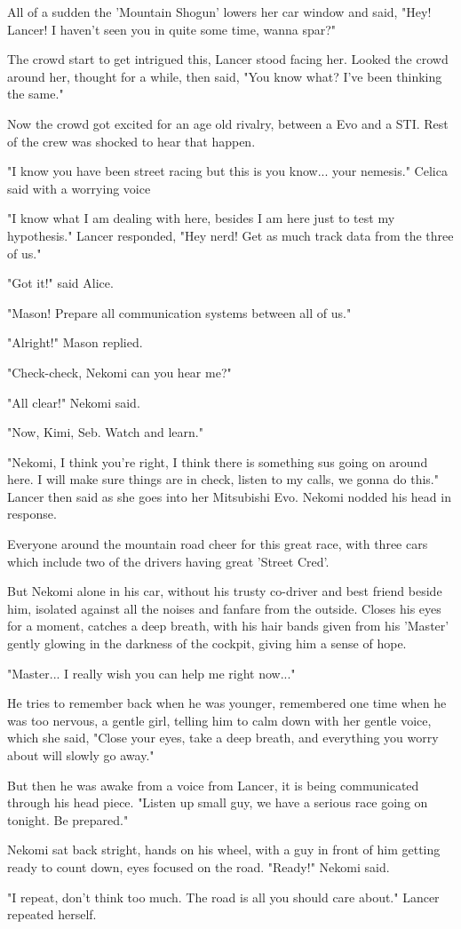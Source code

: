 All of a sudden the 'Mountain Shogun' lowers her car window and said, "Hey! Lancer! I haven't seen you in quite some time, wanna spar?"

The crowd start to get intrigued this, Lancer stood facing her. Looked the crowd around her, thought for a while, then said, "You know what? I've been thinking the same."

Now the crowd got excited for an age old rivalry, between a Evo and a STI. Rest of the crew was shocked to hear that happen.

"I know you have been street racing but this is you know... your nemesis." Celica said with a worrying voice

"I know what I am dealing with here, besides I am here just to test my hypothesis." Lancer responded, "Hey nerd! Get as much track data from the three of us."

"Got it!" said Alice.

"Mason! Prepare all communication systems between all of us."

"Alright!" Mason replied.

"Check-check, Nekomi can you hear me?"

"All clear!" Nekomi said.

"Now, Kimi, Seb. Watch and learn."

"Nekomi, I think you're right, I think there is something sus going on around here. I will make sure things are in check, listen to my calls, we gonna do this." Lancer then said as she goes into her Mitsubishi Evo. Nekomi nodded his head in response.

Everyone around the mountain road cheer for this great race, with three cars which include two of the drivers having great 'Street Cred'.

But Nekomi alone in his car, without his trusty co-driver and best friend beside him, isolated against all the noises and fanfare from the outside. Closes his eyes for a moment, catches a deep breath, with his hair bands given from his 'Master' gently glowing in the darkness of the cockpit, giving him a sense of hope. 

"Master... I really wish you can help me right now..."

He tries to remember back when he was younger, remembered one time when he was too nervous, a gentle girl, telling him to calm down with her gentle voice, which she said, "Close your eyes, take a deep breath, and everything you worry about will slowly go away."

But then he was awake from a voice from Lancer, it is being communicated through his head piece. "Listen up small guy, we have a serious race going on tonight. Be prepared."

Nekomi sat back stright, hands on his wheel, with a guy in front of him getting ready to count down, eyes focused on the road. "Ready!" Nekomi said.

"I repeat, don't think too much. The road is all you should care about." Lancer repeated herself. 